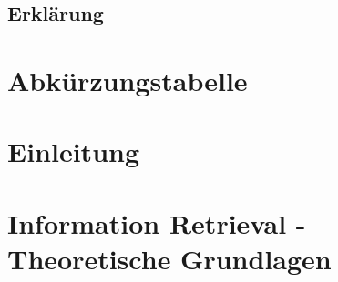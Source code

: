 \documentclass[12pt, a4paper]{scrreprt}
\newcommand\blankpage{%
		\null
		\thispagestyle{empty}%
		\addtocounter{page}{-1}%
		\newpage}
\begin{document}
	
	
	\thispagestyle{empty}
	\section*{Erklärung}
	
	\thispagestyle{empty}
	\newpage
	\begin{abstract}
		
	\end{abstract}
	\afterpage{\blankpage}
	\tableofcontents
	\thispagestyle{empty}
	\listoffigures
	\thispagestyle{empty}
	\chapter*{Abkürzungstabelle}
	\label{abkürzung}
	
	\thispagestyle{empty}
	\chapter{Einleitung}
	\label{einleitung}
	
	\chapter{Information Retrieval - Theoretische Grundlagen}
	\label{grundlagen}
	
	\pagestyle{plain}
	\printbibliography
\end{document}

